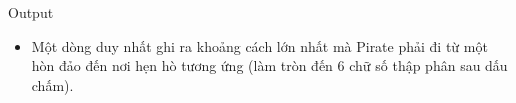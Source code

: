 Output
\begin{itemize}
	\item     Một dòng duy nhất ghi ra khoảng cách lớn nhất mà Pirate phải đi từ một hòn đảo đến nơi hẹn hò tương ứng (làm tròn đến 6 chữ số thập phân sau dấu chấm).   
\end{itemize}